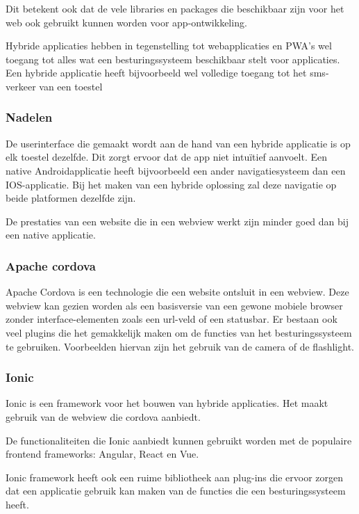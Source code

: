 		Dit betekent ook dat de vele libraries en packages die beschikbaar zijn voor het web ook gebruikt kunnen worden voor app-ontwikkeling.
		
		Hybride applicaties hebben in tegenstelling tot webapplicaties en PWA's wel toegang tot alles wat een besturingssysteem beschikbaar stelt voor applicaties. Een hybride applicatie heeft bijvoorbeeld wel volledige toegang tot het sms-verkeer van een toestel 
		\autocite{Ionic2020}
	
	\subsubsection{Nadelen}
		De userinterface die gemaakt wordt aan de hand van een hybride applicatie is op elk toestel dezelfde. Dit zorgt ervoor dat de app niet intuïtief aanvoelt. Een native Androidapplicatie heeft bijvoorbeeld een ander navigatiesysteem dan een IOS-applicatie. Bij het maken van een hybride oplossing zal deze navigatie op beide platformen dezelfde zijn.
		
		De prestaties van een website die in een webview werkt zijn minder goed dan bij een native applicatie.
		\autocite{Asp2017}	

		
	\subsubsection{Apache cordova}
		Apache Cordova is een technologie die een website ontsluit in een webview. Deze webview kan gezien worden als een basisversie van een gewone mobiele browser zonder interface-elementen zoals een url-veld of een statusbar. Er bestaan ook veel plugins die het gemakkelijk maken om de functies van het besturingssysteem te gebruiken. Voorbeelden hiervan zijn het gebruik van de camera of de flashlight.
		
		
	\subsubsection{Ionic}
		Ionic is een framework voor het bouwen van hybride applicaties. Het maakt gebruik van de webview die cordova aanbiedt.
		
		De functionaliteiten die Ionic aanbiedt kunnen gebruikt worden met de populaire frontend frameworks: Angular, React en Vue.
		
		Ionic framework heeft ook een ruime bibliotheek aan plug-ins die ervoor zorgen dat een applicatie gebruik kan maken van de functies die een besturingssysteem heeft.
		
